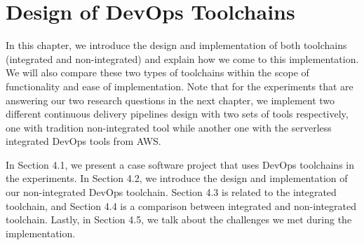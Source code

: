 \chapter{Design of DevOps Toolchains}
In this chapter, we introduce the design and implementation of both toolchains (integrated and non-integrated) and explain how we come to this implementation. We will also compare these two types of toolchains within the scope of functionality and ease of implementation.
Note that for the experiments that are answering our two research questions in the next chapter, we implement two different continuous delivery pipelines design with two sets of tools respectively, one with tradition non-integrated tool while another one with the serverless integrated DevOps tools from AWS.
\par
In Section 4.1, we present a case software project that uses DevOps toolchains in the experiments. In Section 4.2, we introduce the design and implementation of our non-integrated DevOps toolchain. Section 4.3 is related to the integrated toolchain, and Section 4.4 is a comparison between integrated and non-integrated toolchain. Lastly, in Section 4.5, we talk about the challenges we met during the implementation.
